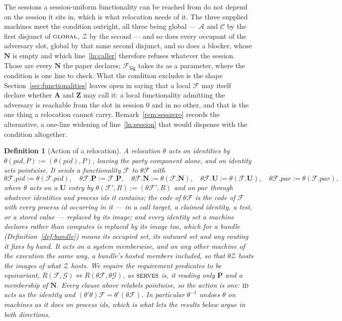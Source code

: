 \documentclass[11pt,a4paper]{article}
\newcommand{\Ps}{\mathbf{P}}
\newcommand{\PID}{\mathit{pid}}
\newcommand{\admits}{\mathbf{N}}
\newcommand{\Apid}{\mathbf{A}}
\newcommand{\Zpid}{\mathbf{Z}}
\newcommand{\pars}{\mathit{par}}
\newcommand{\uses}{\mathbf{U}}
\newcommand{\serves}{\op{serves}}
\newcommand{\Corr}{\mathcal{C}}
\newcommand{\F}{\mathcal{F}}
\newcommand{\G}{\mathcal{G}}
\newcommand{\Zenv}{\mathcal{Z}}
\newcommand{\Adv}{\mathcal{A}}
\newcommand{\op}[1]{\textsc{#1}}
\newcommand{\Fsig}{\mathcal{F}_{\mathsf{Sig}}}
\theoremstyle{accentdef}
\newtheorem{definition}{Definition}[section]
\theoremstyle{accentplain}
\begin{document}
The sessions a session-uniform functionality can be reached from do not depend on the session it sits
in, which is what relocation needs of it. The three supplied machines meet the condition outright,
all three being global --- $\Adv$ and $\Corr$ by the first disjunct of $\op{global}$, $\Zenv$ by the
second --- and so does every occupant of the adversary slot, global by that same second disjunct,
and so does a blocker, whose $\admits$ is empty and which line~\ref{ln:caller} therefore refuses
whatever the session. Those are every $\admits$ the paper declares; $\Fsig$ takes its as a parameter,
where the condition is one line to check. What the condition excludes is the shape
Section~\ref{sec:functionalities} leaves open in saying that a local $\F$ may itself declare whether
$\Apid$ and $\Zpid$ may call it: a local functionality admitting the adversary is reachable from the
slot in session $0$ and in no other, and that is the one thing a relocation cannot carry.
Remark~\ref{rem:sesszero} records the alternative, a one-line widening of line~\ref{ln:session} that
would dispense with the condition altogether.

\begin{definition}[Action of a relocation]\label{def:relocact}
A relocation $\theta$ acts on identities by $\theta(\PID,P) := (\theta(\PID),P)$, leaving the party
component alone, and on identity sets pointwise. It sends a functionality $\F$ to $\theta\F$ with
\[
  \theta\F.\PID := \theta(\F.\PID), \quad
  \theta\F.\Ps := \F.\Ps, \quad
  \theta\F.\admits := \theta(\F.\admits), \quad
  \theta\F.\uses := \theta(\F.\uses), \quad
  \theta\F.\pars := \theta(\F.\pars) ,
\]
where $\theta$ acts on a $\uses$ entry by $\theta(\F',R) := (\theta\F',R)$ and on $\pars$ through
whatever identities and process ids it contains; the code of $\theta\F$ is the code of $\F$
with every process id occurring in it --- in a call target, a claimed identity, a test, or a stored
value --- replaced by its image; and every identity set a machine \emph{declares} rather than
computes is replaced by its image too, which for a bundle (Definition~\ref{def:bundle}) means its
occupied set, its outward set and any routing it fixes by hand. It acts on a system memberwise, and
on any other machine of the execution the same way, a bundle's hosted members included, so that
$\theta\Zenv$ hosts the images of what $\Zenv$ hosts. We require the requirement predicates to be
equivariant, $R(\F,\G) \iff R(\theta\F,\theta\G)$, as $\serves$ is, it reading only $\Ps$ and a
membership of $\admits$. Every clause above relabels pointwise, so the action is one:
$\op{id}$ acts as the identity and $(\theta'\theta)\F = \theta'(\theta\F)$. In particular
$\theta^{-1}$ undoes $\theta$ on machines as it does on process ids, which is what lets the results
below argue in both directions.
\end{definition}
\end{document}
